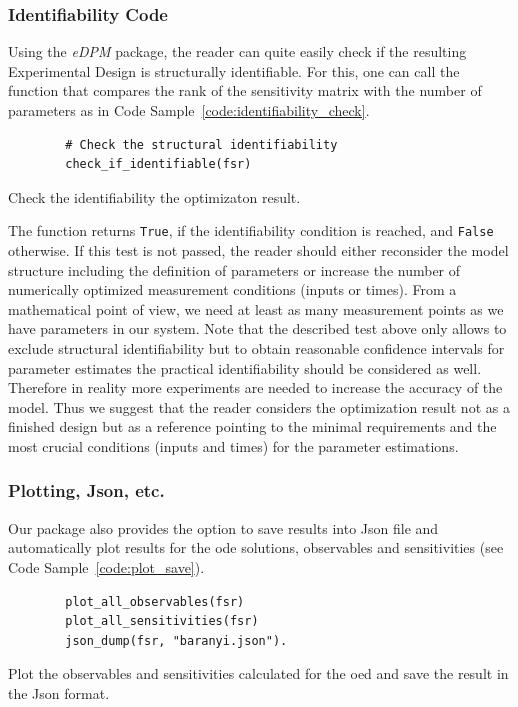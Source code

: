 \documentclass[graybox]{svmult}
\begin{document}
\subsubsection*{Identifiability Code}
Using the {\it eDPM} package, the reader can quite easily check if the resulting Experimental Design is structurally identifiable.
For this, one can call the function that compares the rank of the sensitivity matrix with the number of parameters as in Code Sample~\ref{code:identifiability_check}.
\begin{code}[h]
    \begin{verbatim}
        # Check the structural identifiability
        check_if_identifiable(fsr)
    \end{verbatim}
\caption{Check the identifiability the optimizaton result.}
\label{code:identifiability_check}
\end{code}
The function returns \texttt{True}, if the identifiability condition is reached, and \texttt{False} otherwise.
If this test is not passed, the reader should either reconsider the model structure including the definition of parameters or increase the number of numerically optimized measurement conditions (inputs or times).
From a mathematical point of view, we need at least as many measurement points as we have parameters in our system.
Note that the described test above only allows to exclude structural identifiability but to obtain reasonable confidence intervals for parameter estimates the practical identifiability should be considered as well.
Therefore in reality more experiments are needed to increase the accuracy of the model.
Thus we suggest that the reader considers the optimization result not as a finished design but as a reference pointing to the minimal requirements and the most crucial conditions (inputs and times) for the parameter estimations.
%
\subsubsection*{Plotting, Json, etc.}
Our package also provides the option to save results into Json file and automatically plot results for the ode solutions, observables and sensitivities (see Code Sample~\ref{code:plot_save}).
\begin{code}[h]
    \begin{verbatim}
        plot_all_observables(fsr)
        plot_all_sensitivities(fsr)
        json_dump(fsr, "baranyi.json").
    \end{verbatim}
\caption{Plot the observables and sensitivities calculated for the \ac{oed} and save the result in the Json format.}
\label{code:plot_save}
\end{code}
%
%
%
\end{document}
